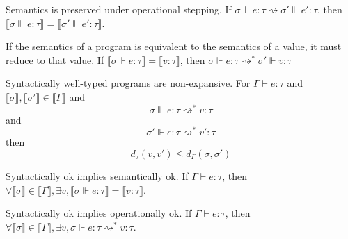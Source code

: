 
Semantics is preserved under operational stepping. If $\sigma \Vdash e : \tau \rightsquigarrow \sigma'
\Vdash e' : \tau$, then $\llbracket \sigma \Vdash e : \tau \rrbracket =
\llbracket \sigma' \Vdash e' : \tau \rrbracket$.

If the semantics of a program is equivalent to the semantics of a value, it must
reduce to that value. If $\llbracket \sigma \Vdash e : \tau \rrbracket =
\llbracket v : \tau \rrbracket$, then $\sigma \Vdash e : \tau
\rightsquigarrow^{*} \sigma' \Vdash v : \tau$

Syntactically well-typed programs are non-expansive. For $\Gamma \vdash e : \tau
$ and $\llbracket \sigma \rrbracket, \llbracket \sigma' \rrbracket \in
\llbracket \Gamma \rrbracket $ and
$$\sigma \Vdash e : \tau \rightsquigarrow^* v : \tau$$ 
and 
$$\sigma' \Vdash e : \tau \rightsquigarrow^* v' : \tau$$
then
$$
d_{\tau}(v, v') \leq d_{\Gamma}(\sigma, \sigma')
$$

Syntactically ok implies semantically ok. If $\Gamma \vdash e : \tau$, then
$\forall \llbracket \sigma \rrbracket \in \llbracket \Gamma \rrbracket, \exists
v, \llbracket \sigma \Vdash e : \tau \rrbracket = \llbracket v : \tau
\rrbracket$.

Syntactically ok implies operationally ok. If $\Gamma \vdash e : \tau$, then
$\forall \llbracket \sigma \rrbracket \in \llbracket \Gamma \rrbracket, \exists
v, \sigma \Vdash e : \tau \rightsquigarrow^{*} v : \tau$.

